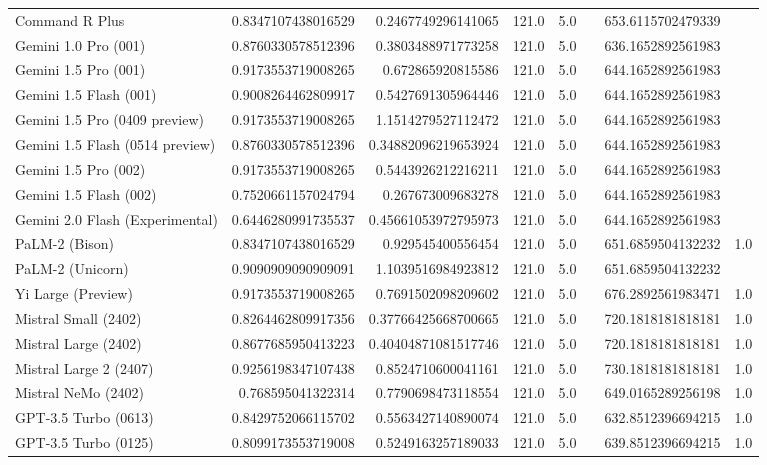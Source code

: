 \begin{table}[htp]
{\begin{tabular}{lrrrrrrr}
Command R Plus & 0.8347107438016529 & 0.2467749296141065 & 121.0 & 5.0 &  & 653.6115702479339 &  \\
Gemini 1.0 Pro (001) & 0.8760330578512396 & 0.3803488971773258 & 121.0 & 5.0 &  & 636.1652892561983 &  \\
Gemini 1.5 Pro (001) & 0.9173553719008265 & 0.672865920815586 & 121.0 & 5.0 &  & 644.1652892561983 &  \\
Gemini 1.5 Flash (001) & 0.9008264462809917 & 0.5427691305964446 & 121.0 & 5.0 &  & 644.1652892561983 &  \\
Gemini 1.5 Pro (0409 preview) & 0.9173553719008265 & 1.1514279527112472 & 121.0 & 5.0 &  & 644.1652892561983 &  \\
Gemini 1.5 Flash (0514 preview) & 0.8760330578512396 & 0.34882096219653924 & 121.0 & 5.0 &  & 644.1652892561983 &  \\
Gemini 1.5 Pro (002) & 0.9173553719008265 & 0.5443926212216211 & 121.0 & 5.0 &  & 644.1652892561983 &  \\
Gemini 1.5 Flash (002) & 0.7520661157024794 & 0.267673009683278 & 121.0 & 5.0 &  & 644.1652892561983 &  \\
Gemini 2.0 Flash (Experimental) & 0.6446280991735537 & 0.45661053972795973 & 121.0 & 5.0 &  & 644.1652892561983 &  \\
PaLM-2 (Bison) & 0.8347107438016529 & 0.929545400556454 & 121.0 & 5.0 &  & 651.6859504132232 & 1.0 \\
PaLM-2 (Unicorn) & 0.9090909090909091 & 1.1039516984923812 & 121.0 & 5.0 &  & 651.6859504132232 &  \\
Yi Large (Preview) & 0.9173553719008265 & 0.7691502098209602 & 121.0 & 5.0 &  & 676.2892561983471 & 1.0 \\
Mistral Small (2402) & 0.8264462809917356 & 0.37766425668700665 & 121.0 & 5.0 &  & 720.1818181818181 & 1.0 \\
Mistral Large (2402) & 0.8677685950413223 & 0.40404871081517746 & 121.0 & 5.0 &  & 720.1818181818181 & 1.0 \\
Mistral Large 2 (2407) & 0.9256198347107438 & 0.8524710600041161 & 121.0 & 5.0 &  & 730.1818181818181 & 1.0 \\
Mistral NeMo (2402) & 0.768595041322314 & 0.7790698473118554 & 121.0 & 5.0 &  & 649.0165289256198 & 1.0 \\
GPT-3.5 Turbo (0613) & 0.8429752066115702 & 0.5563427140890074 & 121.0 & 5.0 &  & 632.8512396694215 & 1.0 \\
GPT-3.5 Turbo (0125) & 0.8099173553719008 & 0.5249163257189033 & 121.0 & 5.0 &  & 639.8512396694215 & 1.0 \\

\end{tabular}}
\end{table}
